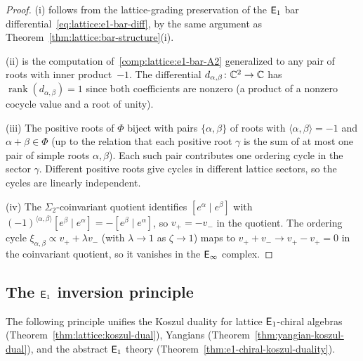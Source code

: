 \begin{proof}
(i) follows from the lattice-grading preservation of the $\mathsf{E}_1$ bar
differential~\eqref{eq:lattice:e1-bar-diff}, by the same argument as
Theorem~\ref{thm:lattice:bar-structure}(i).

(ii) is the computation of~\ref{comp:lattice:e1-bar-A2} generalized
to any pair of roots with inner product~$-1$.  The differential
$d_{\alpha,\beta} \colon \mathbb{C}^2 \to \mathbb{C}$ has
$\operatorname{rank}(d_{\alpha,\beta}) = 1$ since both coefficients are nonzero
(a product of a nonzero cocycle value and a root of unity).

(iii) The positive roots of $\Phi$ biject with pairs
$\{\alpha,\beta\}$ of roots with $\langle\alpha,\beta\rangle = -1$
and $\alpha + \beta \in \Phi$ (up to the relation that each positive
root $\gamma$ is the sum of at most one pair of simple roots
$\alpha,\beta$).  Each such pair contributes one ordering cycle in
the sector $\gamma$.  Different positive roots give cycles in
different lattice sectors, so the cycles are linearly independent.

(iv) The $\Sigma_2$-coinvariant quotient identifies
$[e^\alpha \mid e^\beta]$ with
$(-1)^{\langle\alpha,\beta\rangle} [e^\beta \mid e^\alpha]
= -[e^\beta \mid e^\alpha]$, so $v_+ = -v_-$ in the quotient.
The ordering cycle
$\xi_{\alpha,\beta} \propto v_+ + \lambda v_-$ (with $\lambda \to 1$
as $\zeta \to 1$) maps to $v_+ + v_- \to v_+ - v_+ = 0$ in the
coinvariant quotient, so it vanishes in the $\mathsf{E}_{\infty}$ complex.
\end{proof}


\subsection{The $\mathsf{E}_1$ inversion principle}

The following principle unifies the Koszul duality for
lattice $\mathsf{E}_1$-chiral algebras
(Theorem~\ref{thm:lattice:koszul-dual}),
Yangians (Theorem~\ref{thm:yangian-koszul-dual}), and the
abstract $\mathsf{E}_1$ theory
(Theorem~\ref{thm:e1-chiral-koszul-duality}).

